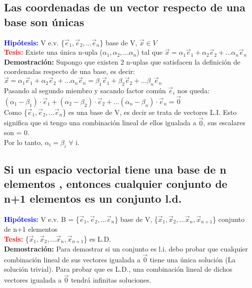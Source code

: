 \documentclass{article}
\begin{document}
\subsection{Las coordenadas de un vector respecto de una base 
son únicas}
{\bfseries \textcolor{blue}{Hipótesis:}} V e.v. \{$\vec{e}_{1}, \vec{e}_2,... \vec{e}_n $\} base de V, $\vec{x} \in V$ \\
{\bfseries \textcolor{red}{Tesis:}} Existe una única n-upla ($\alpha_{1}, \alpha_{2},... \alpha_{n}$) tal que $\vec{x} = \alpha_{1}\vec{e}_{1} + \alpha_{2}\vec{e}_{2} +... \alpha_{n}\vec{e}_{n}$\\
{\bfseries Demostración:} Supongo que existen 2 n-uplas que satisfacen la definición de coordenadas respecto de una base, es decir:\\
$\vec{x} = \alpha_{1}\vec{e}_{1} + \alpha_{2}\vec{e}_{2} +... \alpha_{n}\vec{e}_{n} = \beta_{1}\vec{e}_{1} + \beta_{2}\vec{e}_{2} +... \beta_{n}\vec{e}_{n}$\\
Pasando al segundo miembro y sacando factor común $\vec{e}_i$ nos queda: \\
$(\alpha_{1} - \beta_{1})\cdot\vec{e}_{1} + (\alpha_{2} - \beta_{2})\cdot\vec{e}_{2} +... (\alpha_{n} -\beta_{n})\cdot\vec{e}_{n} = \vec{0}$\\
Como \{$\vec{e}_{1}, \vec{e}_2,... \vec{e}_n $\} es una base de V, es decir se trata de vectores L.I. Esto significa que si tengo una combinación lineal de ellos igualada a $\vec{0}$, sus escalares son = 0. \\
Por lo tanto, $\alpha_{i} = \beta_{i}$ $\forall$ i.
\subsection{Si un espacio vectorial tiene una  base de n 
elementos , entonces cualquier conjunto de n+1 
elementos es un conjunto l.d.}
{\bfseries \textcolor{blue}{Hipótesis:}} V e.v. B = \{$\vec{e}_{1}, \vec{e}_2,... \vec{e}_n $\} base de V, \{$\vec{x}_{1}, \vec{x}_2,... \vec{x}_n, \vec{x}_{n+1} $\} conjunto de n+1 elementos\\
{\bfseries \textcolor{red}{Tesis:}} \{$\vec{x}_{1}, \vec{x}_2,... \vec{x}_n, \vec{x}_{n+1} $\} es L.D.\\
{\bfseries Demostración:} Para demostrar si un conjunto es l.i.  debo probar 
que cualquier combinación lineal de sus vectores igualada a $\vec{0}$ tiene una única solución (La solución trivial). Para probar que es L.D., una combinación lineal de dichos vectores igualada a $\vec{0}$ tendrá infinitas soluciones. \\
\end{document}
